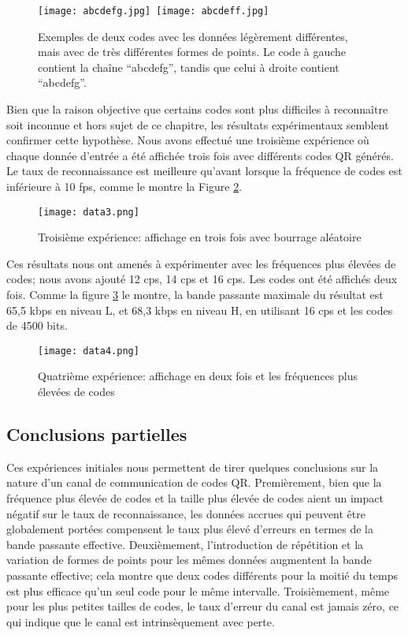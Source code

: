 \begin{figure}
\centering
\texttt{[image: abcdefg.jpg]}~\texttt{[image: abcdeff.jpg]}
\caption{Exemples de deux codes avec les données légèrement différentes, mais avec de très différentes formes de points. Le code à gauche contient la chaîne ``abcdefg'', tandis que celui à droite contient ``abcdefg''.}
\label{fig:qr:difcodes}
\end{figure}

Bien que la raison objective que certains codes sont plus difficiles à reconnaître soit inconnue et hors sujet de ce chapitre, les résultats expérimentaux semblent confirmer cette hypothèse. Nous avons effectué une troisième expérience où chaque donnée d'entrée a été affichée trois fois avec différents codes QR générés. Le taux de reconnaissance est meilleure qu'avant lorsque la fréquence de codes est inférieure à 10 fps, comme le montre la Figure \ref{img-exp3}.

\begin{figure}[ht]
\begin{center}
\centering
\texttt{[image: data3.png]}
\caption{Troisième expérience: affichage en trois fois avec bourrage aléatoire}
\label{img-exp3}
\end{center}
\end{figure}

Ces résultats nous ont amenés à expérimenter avec les fréquences plus élevées de codes; nous avons ajouté 12 cps, 14 cps et 16 cps. Les codes ont été affichés deux fois. Comme la figure \ref{img-exp4} le montre, la bande passante maximale du résultat est 65,5 kbps en niveau L, et 68,3 kbps en niveau H, en utilisant 16 cps et les codes de 4500 bits.

\begin{figure}[ht]
\begin{center}
\centering
\texttt{[image: data4.png]}
\caption{Quatrième expérience: affichage en deux fois et les fréquences plus élevées de codes}
\label{img-exp4}
\end{center}
\end{figure}

\subsection{Conclusions partielles}

Ces expériences initiales nous permettent de tirer quelques conclusions sur la nature d'un canal de communication de codes QR. Premièrement, bien que la fréquence plus élevée de codes et la taille plus élevée de codes aient un impact négatif sur le taux de reconnaissance, les données accrues qui peuvent être globalement portées compensent le taux plus élevé d'erreurs en termes de la bande passante effective. Deuxièmement, l'introduction de répétition et la variation de formes de points pour les mêmes données augmentent la bande passante effective; cela montre que deux codes différents pour la moitié du temps est plus efficace qu'un seul code pour le même intervalle. Troisièmement, même pour les plus petites tailles de codes, le taux d'erreur du canal est jamais zéro, ce qui indique que le canal est intrinsèquement avec perte.

